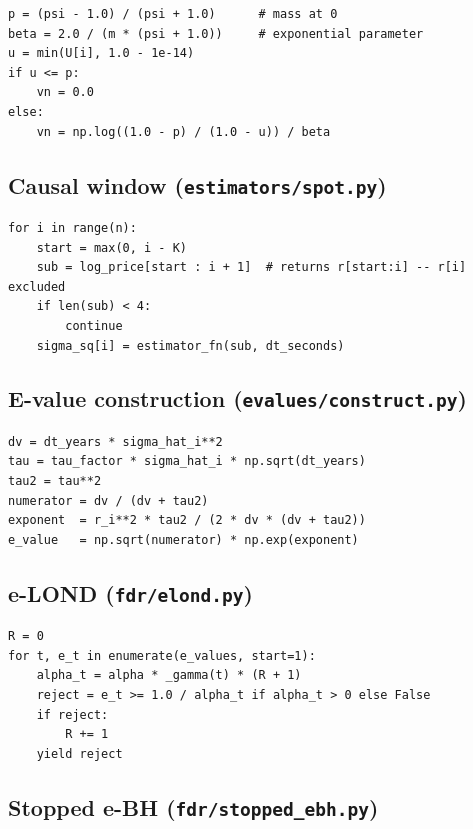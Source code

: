 \documentclass[11pt,a4paper]{article}
\theoremstyle{plain}
\theoremstyle{definition}
\theoremstyle{remark}
\begin{document}
\begin{lstlisting}[caption={Case $\psi > 1.5$ (high dispersion) in the QE scheme.}]
p = (psi - 1.0) / (psi + 1.0)      # mass at 0
beta = 2.0 / (m * (psi + 1.0))     # exponential parameter
u = min(U[i], 1.0 - 1e-14)
if u <= p:
    vn = 0.0
else:
    vn = np.log((1.0 - p) / (1.0 - u)) / beta
\end{lstlisting}

\subsection{Causal window (\texttt{estimators/spot.py})}

\begin{lstlisting}[caption={Window excluding the tested point i.}]
for i in range(n):
    start = max(0, i - K)
    sub = log_price[start : i + 1]  # returns r[start:i] -- r[i] excluded
    if len(sub) < 4:
        continue
    sigma_sq[i] = estimator_fn(sub, dt_seconds)
\end{lstlisting}

\subsection{E-value construction (\texttt{evalues/construct.py})}

\begin{lstlisting}[caption={GROW formula.}]
dv = dt_years * sigma_hat_i**2
tau = tau_factor * sigma_hat_i * np.sqrt(dt_years)
tau2 = tau**2
numerator = dv / (dv + tau2)
exponent  = r_i**2 * tau2 / (2 * dv * (dv + tau2))
e_value   = np.sqrt(numerator) * np.exp(exponent)
\end{lstlisting}

\subsection{e-LOND (\texttt{fdr/elond.py})}

\begin{lstlisting}[caption={Main loop.}]
R = 0
for t, e_t in enumerate(e_values, start=1):
    alpha_t = alpha * _gamma(t) * (R + 1)
    reject = e_t >= 1.0 / alpha_t if alpha_t > 0 else False
    if reject:
        R += 1
    yield reject
\end{lstlisting}

\subsection{Stopped e-BH (\texttt{fdr/stopped\_ebh.py})}
\end{document}
